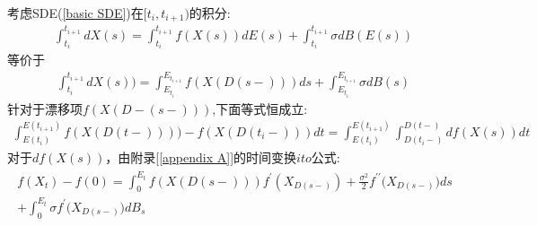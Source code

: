 \documentclass[12pt,final]{article}
\makeatletter
\numberwithin{equation}{section}
\numberwithin{figure}{section}
\numberwithin{table}{section}
\theoremstyle{plain}
\renewcommand{\proofname}{proof}
\theoremstyle{definition}
\theoremstyle{remark}
\renewenvironment{proof}[1][\proofname]{\par
  \pushQED{\qed}%
  \normalfont \topsep6\p@\@plus6\p@\relax
  \trivlist\item[\hskip\labelsep
  \bfseries #1\@addpunct{\,:\,}]\ignorespaces
}{%
  \popQED\endtrivlist\@endpefalse
}
\makeatother
\begin{document}
\begin{proof}
考虑SDE(\ref{basic SDE})在$[t_i,t_{i+1})$的积分:
\begin{align}
	\int_{t_i}^{t_{i+1}}dX(s)=\int_{t_i}^{t_{i+1}}f(X(s))dE(s)+\int_{t_i}^{t_{i+1}}\sigma dB(E(s))
\end{align}
等价于
\begin{align}
	\int_{t_i}^{t_{i+1}}dX(s))=\int_{E_{t_i}}^{E_{t_{i+1}}}f(X(D(s-)))ds+\int_{E_{t_i}}^{E_{t_{i+1}}}\sigma dB(s)
\end{align}
针对于漂移项$f(X(D-(s-)))$,下面等式恒成立:
\begin{align}\label{eq:ito}
	\int_{E(t_i)}^{E(t_{i+1})} f(X(D(t-)))) - f(X(D(t_i-))) dt = \int_{E(t_i)}^{E(t_{i+1})} \int^{D(t-)}_{D(t_i-)} df(X(s)) dt
\end{align}
对于$df(X(s))$，由附录[\ref{appendix A}]的时间变换$ito$公式:
\begin{align*}
	\begin{gathered}
		f(X_{t})-f(0)=\int_{0}^{E_{t}}f(X(D(s-)))f^{\prime}\left(X_{D(s-)}\right)+\frac{\sigma^{2}}{2}f^{\prime\prime}\big(X_{D(s-)}\big)ds \\
		+\int_{0}^{E_{t}}\sigma f^{\prime}\big(X_{D(s-)}\big)dB_{s}
	\end{gathered}
\end{align*}


\end{proof}
\end{document}
